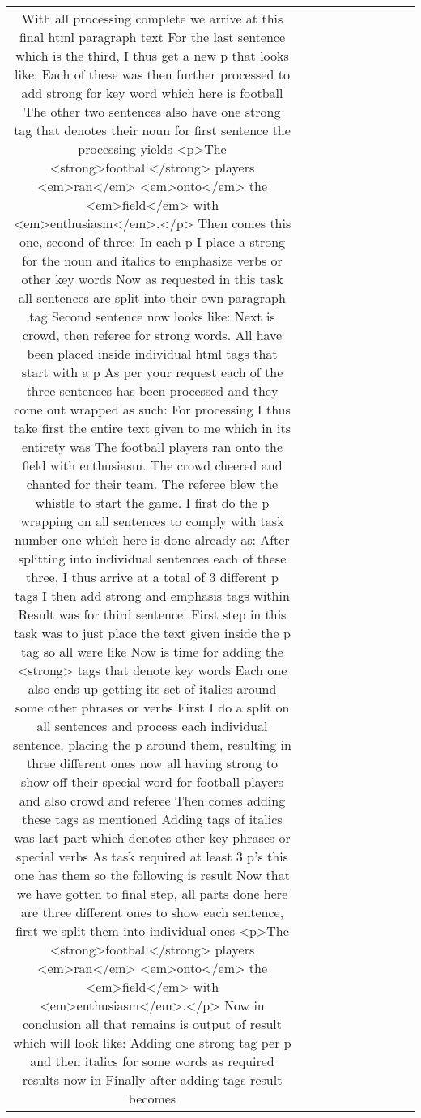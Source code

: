 \begin{table}[h!]
\begin{tabular}{|c|c|c|c|c|c|c|c|c|c|}
With all processing complete we arrive at this final html paragraph text 
For the last sentence which is the third, I thus get a new p that looks like:  
Each of these was then further processed to add strong for key word which here is football 
The other two sentences also have one strong tag that denotes their noun
for first sentence the processing yields 
<p>The <strong>football</strong> players <em>ran</em> <em>onto</em> the <em>field</em> with <em>enthusiasm</em>.</p>
Then comes this one, second of three: 
In each p I place a strong for the noun and italics to emphasize verbs or other key words
Now as requested in this task all sentences are split into their own paragraph tag 
Second sentence now looks like:
Next is crowd, then referee for strong words. 
All have been placed inside individual html tags that start with a p
As per your request each of the three sentences has been processed and they come out wrapped as such:  
For processing I thus take first the entire text given to me 
which in its entirety was 
The football players ran onto the field with enthusiasm. The crowd cheered and chanted for their team. The referee blew the whistle to start the game.
I first do the p wrapping on all sentences to comply with task number one which here is done already as:
After splitting into individual sentences each of these three, I thus arrive at a total of 3 different p tags
I then add strong and emphasis tags within 
Result was for third sentence: 
First step in this task was to just place the text given inside the p tag so all were like 
Now is time for adding the <strong> tags that denote key words 
Each one also ends up getting its set of italics around some other phrases or verbs
First I do a split on all sentences and process each individual sentence, placing the p around them, resulting in three different ones now all having strong to show off their special word for football players and also crowd and referee
Then comes adding these tags as mentioned 
Adding tags of italics was last part which denotes other key phrases or special verbs 
As task required at least 3 p's this one has them so the following is result 
Now that we have gotten to final step, all parts done here are three different ones to show each sentence, first we split them into individual ones
<p>The <strong>football</strong> players <em>ran</em> <em>onto</em> the <em>field</em> with <em>enthusiasm</em>.</p>
Now in conclusion all that remains is output of result which will look like:
Adding one strong tag per p and then italics for some words as required results now in 
Finally after adding tags result becomes 

\end{tabular}
\end{table}
